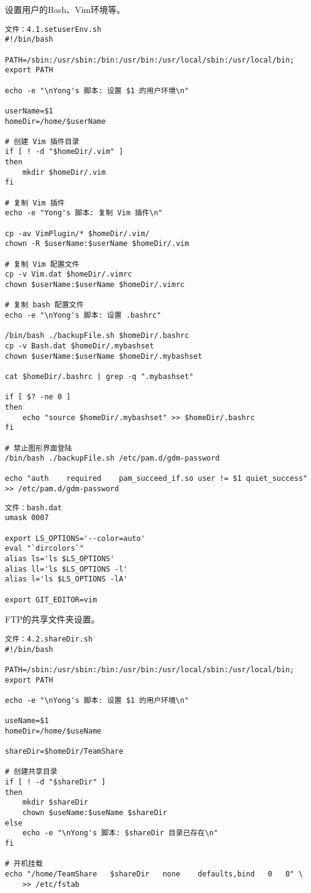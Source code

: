 设置用户的Bash、Vim环境等。
\begin{Verbatim}[]
文件：4.1.setuserEnv.sh
#!/bin/bash

PATH=/sbin:/usr/sbin:/bin:/usr/bin:/usr/local/sbin:/usr/local/bin; export PATH

echo -e "\nYong's 脚本: 设置 $1 的用户环境\n"

userName=$1
homeDir=/home/$userName

# 创建 Vim 插件目录
if [ ! -d "$homeDir/.vim" ]
then
	mkdir $homeDir/.vim
fi

# 复制 Vim 插件
echo -e "Yong's 脚本: 复制 Vim 插件\n"

cp -av VimPlugin/* $homeDir/.vim/
chown -R $userName:$userName $homeDir/.vim

# 复制 Vim 配置文件
cp -v Vim.dat $homeDir/.vimrc
chown $userName:$userName $homeDir/.vimrc

# 复制 bash 配置文件
echo -e "\nYong's 脚本: 设置 .bashrc"

/bin/bash ./backupFile.sh $homeDir/.bashrc
cp -v Bash.dat $homeDir/.mybashset
chown $userName:$userName $homeDir/.mybashset

cat $homeDir/.bashrc | grep -q ".mybashset"

if [ $? -ne 0 ]
then
	echo "source $homeDir/.mybashset" >> $homeDir/.bashrc
fi

# 禁止图形界面登陆
/bin/bash ./backupFile.sh /etc/pam.d/gdm-password

echo "auth    required    pam_succeed_if.so user != $1 quiet_success" >> /etc/pam.d/gdm-password
\end{Verbatim}


\begin{Verbatim}[]
文件：bash.dat
umask 0007

export LS_OPTIONS='--color=auto'
eval "`dircolors`"
alias ls='ls $LS_OPTIONS'
alias ll='ls $LS_OPTIONS -l'
alias l='ls $LS_OPTIONS -lA'

export GIT_EDITOR=vim
\end{Verbatim}

FTP的共享文件夹设置。
\begin{Verbatim}[]
文件：4.2.shareDir.sh
#!/bin/bash

PATH=/sbin:/usr/sbin:/bin:/usr/bin:/usr/local/sbin:/usr/local/bin; export PATH

echo -e "\nYong's 脚本: 设置 $1 的用户环境\n"

useName=$1
homeDir=/home/$useName

shareDir=$homeDir/TeamShare

# 创建共享目录
if [ ! -d "$shareDir" ]
then
	mkdir $shareDir
	chown $useName:$useName $shareDir
else
	echo -e "\nYong's 脚本: $shareDir 目录已存在\n"
fi

# 开机挂载
echo "/home/TeamShare	$shareDir	none	defaults,bind	0	0" \
	>> /etc/fstab
\end{Verbatim}

